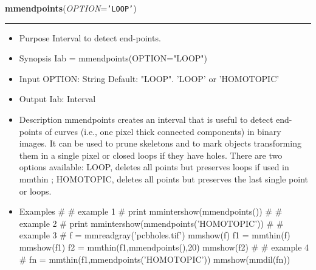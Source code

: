     \label{multireg:num_pymorph:mmendpoints}
    \vspace{0.5ex}

    \begin{boxedminipage}{\textwidth}

    \raggedright \textbf{mmendpoints}(\textit{OPTION}=\texttt{'\-L\-O\-O\-P\-'\-})

    \vspace{-1.5ex}

    \rule{\textwidth}{0.5\fboxrule}
    \begin{itemize}
    \setlength{\parskip}{0.6ex}
      \item Purpose Interval to detect end-points.

      \item Synopsis Iab = mmendpoints(OPTION="LOOP")

      \item Input OPTION: String Default: "LOOP". 'LOOP' or 'HOMOTOPIC'

      \item Output Iab: Interval

      \item Description mmendpoints creates an interval that is useful to 
        detect end-points of curves (i.e., one pixel thick connected 
        components) in binary images. It can be used to prune skeletons 
        and to mark objects transforming them in a single pixel or closed 
        loops if they have holes. There are two options available: LOOP, 
        deletes all points but preserves loops if used in mmthin ; 
        HOMOTOPIC, deletes all points but preserves the last single point 
        or loops.

      \item Examples \# \# example 1 \# print mmintershow(mmendpoints()) \# 
        \# example 2 \# print mmintershow(mmendpoints('HOMOTOPIC')) \# \# 
        example 3 \# f = mmreadgray('pcbholes.tif') mmshow(f) f1 = 
        mmthin(f) mmshow(f1) f2 = mmthin(f1,mmendpoints(),20) mmshow(f2) 
        \# \# example 4 \# fn = mmthin(f1,mmendpoints('HOMOTOPIC')) 
        mmshow(mmdil(fn))

    \end{itemize}

    \vspace{1ex}

    \end{boxedminipage}

